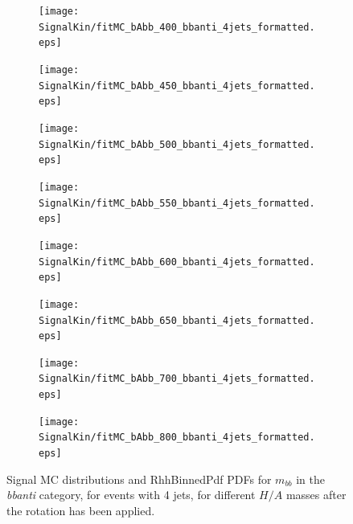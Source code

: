 \begin{figure}[phtb!]
  \begin{center}
  \begin{subfigure}[$m_{A}=400$ GeV]{0.4\textwidth}\texttt{[image: SignalKin/fitMC\_bAbb\_400\_bbanti\_4jets\_formatted.eps]}\end{subfigure}
  \begin{subfigure}[$m_{A}=450$ GeV]{0.4\textwidth}\texttt{[image: SignalKin/fitMC\_bAbb\_450\_bbanti\_4jets\_formatted.eps]}\end{subfigure}
  \begin{subfigure}[$m_{A}=500$ GeV]{0.4\textwidth}\texttt{[image: SignalKin/fitMC\_bAbb\_500\_bbanti\_4jets\_formatted.eps]}\end{subfigure}
  \begin{subfigure}[$m_{A}=550$ GeV]{0.4\textwidth}\texttt{[image: SignalKin/fitMC\_bAbb\_550\_bbanti\_4jets\_formatted.eps]}\end{subfigure}
  \begin{subfigure}[$m_{A}=600$ GeV]{0.4\textwidth}\texttt{[image: SignalKin/fitMC\_bAbb\_600\_bbanti\_4jets\_formatted.eps]}\end{subfigure}
  \begin{subfigure}[$m_{A}=650$ GeV]{0.4\textwidth}\texttt{[image: SignalKin/fitMC\_bAbb\_650\_bbanti\_4jets\_formatted.eps]}\end{subfigure}
  \begin{subfigure}[$m_{A}=700$ GeV]{0.4\textwidth}\texttt{[image: SignalKin/fitMC\_bAbb\_700\_bbanti\_4jets\_formatted.eps]}\end{subfigure}
  \begin{subfigure}[$m_{A}=800$ GeV]{0.4\textwidth}\texttt{[image: SignalKin/fitMC\_bAbb\_800\_bbanti\_4jets\_formatted.eps]}\end{subfigure}
  \caption{Signal MC distributions and RhhBinnedPdf PDFs for $m_{bb}$ in the {\it bbanti} category, for events with 4 jets, for different $H/A$ masses after the rotation has been applied.\label{fig:signalPDFs_4j_bbanti}} 
    \end{center}
\end{figure}


